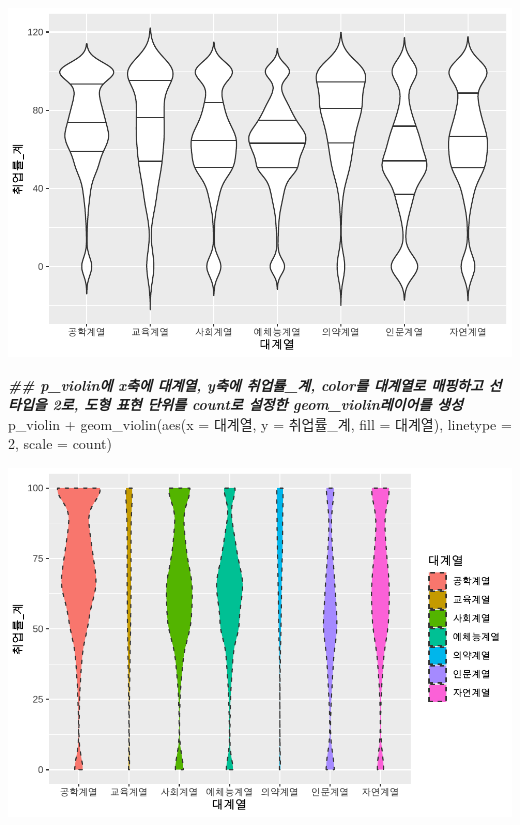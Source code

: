 \documentclass[
]{article}
\newenvironment{Shaded}{\begin{snugshade}}{\end{snugshade}}
\newcommand{\AttributeTok}[1]{\textcolor[rgb]{0.77,0.63,0.00}{#1}}
\newcommand{\DecValTok}[1]{\textcolor[rgb]{0.00,0.00,0.81}{#1}}
\newcommand{\DocumentationTok}[1]{\textcolor[rgb]{0.56,0.35,0.01}{\textbf{\textit{#1}}}}
\newcommand{\FunctionTok}[1]{\textcolor[rgb]{0.00,0.00,0.00}{#1}}
\newcommand{\NormalTok}[1]{#1}
\newcommand{\SpecialCharTok}[1]{\textcolor[rgb]{0.00,0.00,0.00}{#1}}
\newcommand{\StringTok}[1]{\textcolor[rgb]{0.31,0.60,0.02}{#1}}
\begin{document}
\includegraphics{chap3_files/figure-latex/unnamed-chunk-40-2.pdf}

\begin{Shaded}
\begin{Highlighting}[]
\DocumentationTok{\#\# p\_violin에 x축에 대계열, y축에 취업률\_계, color를 대계열로 매핑하고 선타입을 2로, 도형 표현 단위를 \textquotesingle{}count\textquotesingle{}로 설정한 geom\_violin레이어를 생성}
\NormalTok{p\_violin }\SpecialCharTok{+} 
  \FunctionTok{geom\_violin}\NormalTok{(}\FunctionTok{aes}\NormalTok{(}\AttributeTok{x =}\NormalTok{ 대계열, }\AttributeTok{y =}\NormalTok{ 취업률\_계, }\AttributeTok{fill =}\NormalTok{ 대계열), }\AttributeTok{linetype =} \DecValTok{2}\NormalTok{, }\AttributeTok{scale =} \StringTok{\textquotesingle{}count\textquotesingle{}}\NormalTok{) }
\end{Highlighting}
\end{Shaded}

\includegraphics{chap3_files/figure-latex/unnamed-chunk-40-3.pdf}
\end{document}
